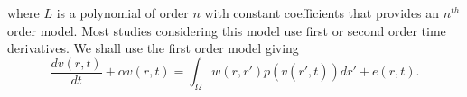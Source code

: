 \documentclass[onecolumn,draftcls]{IEEEtran}
\begin{document}
where $L$ is a polynomial of order $n$ with constant coefficients that provides an $n^{th}$ order model. Most studies considering this model use first or second order time derivatives. We shall use the first order model giving
\begin{equation}\label{FinalForm1}
\frac{{dv\left( {r,t} \right)}}{{dt}} + \alpha{v\left( {r,t} \right)} = \int_\Omega  {w\left( {r,r'} \right)p\left( {v\left( {r',\bar t} \right)} \right)dr'}  +e\left( {r,t} \right).
\end{equation}
\end{document}
